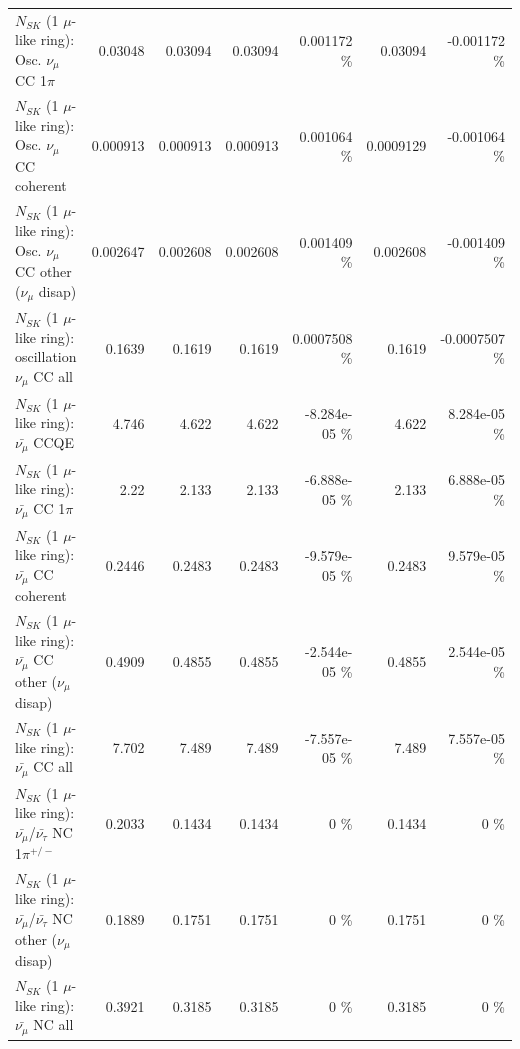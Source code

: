 \begin{table}
\begin{tabular}{| l | r | r | r  r | r  r |}
                          $N_{SK}$ (1 $\mu$-like ring): Osc. $\nu_\mu$ CC 1$\pi$ &         0.03048 &         0.03094 &         0.03094 & 0.001172 \%  &         0.03094 & -0.001172 \%  \\ 
                        $N_{SK}$ (1 $\mu$-like ring): Osc. $\nu_\mu$ CC coherent &        0.000913 &        0.000913 &        0.000913 & 0.001064 \%  &       0.0009129 & -0.001064 \%  \\ 
         $N_{SK}$ (1 $\mu$-like ring): Osc. $\nu_\mu$ CC other ($\nu_\mu$ disap) &        0.002647 &        0.002608 &        0.002608 & 0.001409 \%  &        0.002608 & -0.001409 \%  \\ 
                      $N_{SK}$ (1 $\mu$-like ring): oscillation $\nu_\mu$ CC all &          0.1639 &          0.1619 &          0.1619 & 0.0007508 \%  &          0.1619 & -0.0007507 \%  \\ 
\hline
\hline
                              $N_{SK}$ (1 $\mu$-like ring): $\bar{\nu_\mu}$ CCQE &           4.746 &           4.622 &           4.622 & -8.284e-05 \%  &           4.622 & 8.284e-05 \%  \\ 
                         $N_{SK}$ (1 $\mu$-like ring): $\bar{\nu_\mu}$ CC 1$\pi$ &            2.22 &           2.133 &           2.133 & -6.888e-05 \%  &           2.133 & 6.888e-05 \%  \\ 
                       $N_{SK}$ (1 $\mu$-like ring): $\bar{\nu_\mu}$ CC coherent &          0.2446 &          0.2483 &          0.2483 & -9.579e-05 \%  &          0.2483 & 9.579e-05 \%  \\ 
        $N_{SK}$ (1 $\mu$-like ring): $\bar{\nu_\mu}$ CC other ($\nu_\mu$ disap) &          0.4909 &          0.4855 &          0.4855 & -2.544e-05 \%  &          0.4855 & 2.544e-05 \%  \\ 
                          $N_{SK}$ (1 $\mu$-like ring): $\bar{\nu_{\mu}}$ CC all &           7.702 &           7.489 &           7.489 & -7.557e-05 \%  &           7.489 & 7.557e-05 \%  \\ 
\hline
  $N_{SK}$ (1 $\mu$-like ring): $\bar{\nu_\mu}$/$\bar{\nu_\tau}$ NC 1$\pi^{+/-}$ &          0.2033 &          0.1434 &          0.1434 &        0 \%  &          0.1434 &        0 \%  \\ 
$N_{SK}$ (1 $\mu$-like ring): $\bar{\nu_\mu}$/$\bar{\nu_\tau}$ NC other ($\nu_\mu$ disap) &          0.1889 &          0.1751 &          0.1751 &        0 \%  &          0.1751 &        0 \%  \\ 
                          $N_{SK}$ (1 $\mu$-like ring): $\bar{\nu_{\mu}}$ NC all &          0.3921 &          0.3185 &          0.3185 &        0 \%  &          0.3185 &        0 \%  \\ 

\end{tabular}
\end{table}
